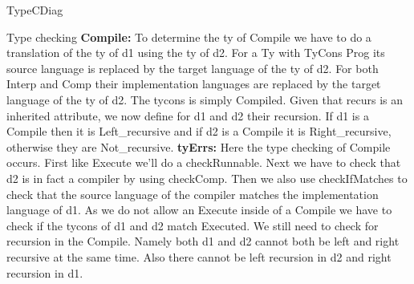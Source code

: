 \documentclass{article}
\begin{document}
\begin{subsection}{TypeCDiag}
\begin{subsubsection}{Type checking}
\textbf{Compile:} To determine the ty of Compile we have to do a translation of the ty of d1 using the ty of d2. For a Ty with TyCons Prog its source language is replaced by the target language of the ty of d2. For both Interp and Comp their implementation languages are replaced by the target language of the ty of d2. The tycons is simply Compiled. Given that recurs is an inherited attribute, we now define for d1 and d2 their recursion. If d1 is a Compile then it is Left\_recursive and if d2 is a Compile it is Right\_recursive, otherwise they are Not\_recursive. 
\textbf{tyErrs:} Here the type checking of Compile occurs. First like Execute we'll do a checkRunnable. Next we have to check that d2 is in fact a compiler by using checkComp. Then we also use checkIfMatches to check that the source language of the compiler matches the implementation language of d1. As we do not allow an Execute inside of a Compile we have to check if the tycons of d1 and d2 match Executed. We still need to check for recursion in the Compile. Namely both d1 and d2 cannot both be left and right recursive at the same time. Also there cannot be left recursion in d2 and right recursion in d1.
\end{subsubsection}
\end{subsection}
\end{document}
